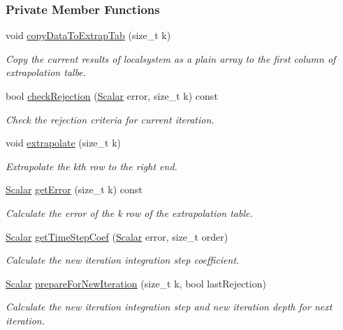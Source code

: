 \subsubsection*{Private Member Functions}
\begin{DoxyCompactItemize}
\item 
void \mbox{\hyperlink{class_b_s_iterator_a95c268219a8321af35a628db4e22bec4}{copy\+Data\+To\+Extrap\+Tab}} (size\+\_\+t k)
\begin{DoxyCompactList}\small\item\em Copy the current results of localsystem as a plain array to the first column of extrapolation talbe. \end{DoxyCompactList}\item 
bool \mbox{\hyperlink{class_b_s_iterator_a42976d786ffe422a86cc5a7b0a077609}{check\+Rejection}} (\mbox{\hyperlink{class_b_s_iterator_a7857f8ff9032955ea4dcc22cd18ca7a1}{Scalar}} error, size\+\_\+t k) const
\begin{DoxyCompactList}\small\item\em Check the rejection criteria for current iteration. \end{DoxyCompactList}\item 
void \mbox{\hyperlink{class_b_s_iterator_ac1edf158e3dd05ed15afd5d0f31c121a}{extrapolate}} (size\+\_\+t k)
\begin{DoxyCompactList}\small\item\em Extrapolate the kth row to the right end. \end{DoxyCompactList}\item 
\mbox{\hyperlink{class_b_s_iterator_a7857f8ff9032955ea4dcc22cd18ca7a1}{Scalar}} \mbox{\hyperlink{class_b_s_iterator_a9f50e084f8650e4d7fea3535a0547139}{get\+Error}} (size\+\_\+t k) const
\begin{DoxyCompactList}\small\item\em Calculate the error of the k row of the extrapolation table. \end{DoxyCompactList}\item 
\mbox{\hyperlink{class_b_s_iterator_a7857f8ff9032955ea4dcc22cd18ca7a1}{Scalar}} \mbox{\hyperlink{class_b_s_iterator_a9d06a0d0c9e458ea96952b0514adece9}{get\+Time\+Step\+Coef}} (\mbox{\hyperlink{class_b_s_iterator_a7857f8ff9032955ea4dcc22cd18ca7a1}{Scalar}} error, size\+\_\+t order)
\begin{DoxyCompactList}\small\item\em Calculate the new iteration integration step coefficient. \end{DoxyCompactList}\item 
\mbox{\hyperlink{class_b_s_iterator_a7857f8ff9032955ea4dcc22cd18ca7a1}{Scalar}} \mbox{\hyperlink{class_b_s_iterator_a738a558ddfacd9959c9438862001d7e8}{prepare\+For\+New\+Iteration}} (size\+\_\+t k, bool last\+Rejection)
\begin{DoxyCompactList}\small\item\em Calculate the new iteration integration step and new iteration depth for next iteration. \end{DoxyCompactList}\end{DoxyCompactItemize}
